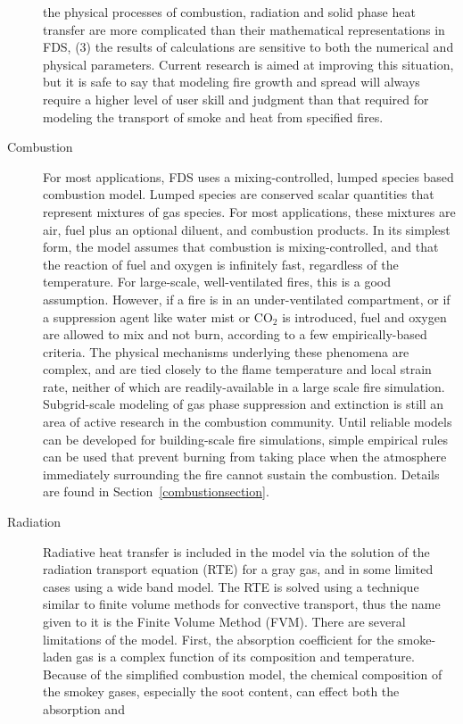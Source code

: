 \documentclass[11pt]{book}
\begin{document}
\begin{description}
the physical processes of combustion, radiation and solid phase heat transfer are more complicated than their mathematical representations in FDS,
(3) the results of calculations are sensitive to both the numerical and physical parameters. Current research is aimed at improving this situation,
but it is safe to say that modeling fire growth and spread will always require a higher level of user skill and judgment than that required for
modeling the transport of smoke and heat from specified fires.
\item[Combustion]
For most applications, FDS uses a mixing-controlled, lumped species based combustion model. Lumped species are conserved scalar quantities that
represent mixtures of gas species.  For most applications, these mixtures are air, fuel plus an optional diluent, and combustion products.  In its
simplest form, the model assumes that combustion is mixing-controlled, and that the reaction of fuel and oxygen is infinitely fast, regardless of the
temperature. For large-scale, well-ventilated fires, this is a good assumption. However, if a fire is in an under-ventilated compartment, or if a
suppression agent like water mist or CO$_2$ is introduced, fuel and oxygen are allowed to mix and not burn, according to a few empirically-based
criteria. The physical mechanisms underlying these phenomena are complex, and are tied closely to the flame temperature and local strain rate,
neither of which are readily-available in a large scale fire simulation. Subgrid-scale modeling of gas phase suppression and extinction is still an
area of active research in the combustion community. Until reliable models can be developed for building-scale fire simulations, simple empirical
rules can be used that prevent burning from taking place when the atmosphere immediately surrounding the fire cannot sustain the combustion. Details
are found in Section~\ref{combustionsection}.
\item[Radiation] Radiative heat transfer is included in the model via
the solution of the radiation transport equation (RTE) for a gray gas, and in some limited cases using a wide band model.  The RTE is solved using a
technique similar to finite volume methods for convective transport, thus the name given to it is the Finite Volume Method (FVM). There are several
limitations of the model. First, the absorption coefficient for the smoke-laden gas is a complex function of its composition and temperature. Because
of the simplified combustion model, the chemical composition of the smokey gases, especially the soot content, can effect both the absorption and

\end{description}
\end{document}
